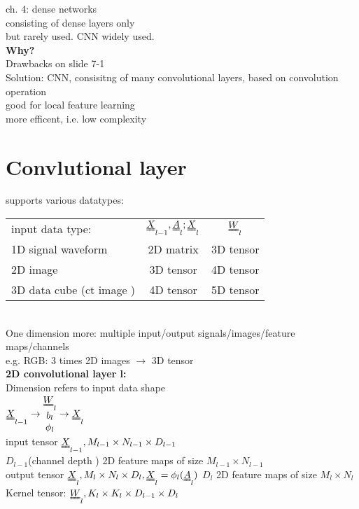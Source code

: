 ch. 4: dense networks \\
\textbullet consisting of dense layers only \\
\textbullet but rarely used. CNN widely used.\\
\textbf{Why?}\\
\textbullet Drawbacks on slide 7-1\\
Solution: CNN, consisitng of many convolutional layers, based on convolution operation\\
\textbullet good for local feature learning\\
\textbullet more efficent, i.e. low complexity
\section{Convlutional layer} 
supports various datatypes:\\
\begin{tabular}{lcc}
input data type:  &$  \X_{l-1}, \A_l ; \X_l$ &$ \W_l$ \\
1D signal waveform & 2D matrix & 3D tensor\\
2D image & 3D tensor & 4D tensor\\
3D data cube (ct image ) & 4D tensor & 5D tensor\\
\end{tabular}\\
One dimension more: multiple input/output signals/images/feature maps/channels\\
e.g. RGB: 3 times 2D images $ \rightarrow $ 3D tensor \\
\textbf{2D convolutional layer l:}\\
Dimension refers to input data shape \\
$ \X_{l-1}  \rightarrow \begin{matrix}
\W_l \\
b_l \\
\phi_l 
\end{matrix} \rightarrow \X_l$\\
\textbullet input tensor $  \X_{l-1} , M_{l-1 }  \times N_{l-1} \times D _{l-1 }$
\\
$ D_{l-1}$(channel depth ) 2D feature maps of size $ M_{l-1} \times N_{l-1 }   $ \\
\textbullet output tensor $  \X_l , M_l \times N_l \times D_l , \X_l = \phi_l (\A_l ) $
$ D_l   $ 2D feature maps of size $  M_l \times N_l $
\textbullet Kernel tensor: $ \W_l , K_l \times K_l \times D_{l-1 } \times D_l  $\\
